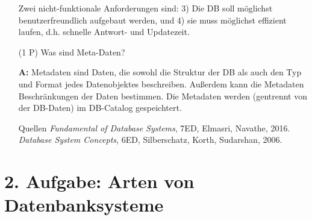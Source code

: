 \documentclass[12pt]{report}
\newcommand{\answer}{\textbf{A:}}
\begin{document}
\begin{enumerate}
  Zwei nicht-funktionale Anforderungen sind: 3) Die DB soll möglichst benutzerfreundlich aufgebaut werden, und 4) sie muss möglichst effizient laufen, d.h. schnelle Antwort- und Updatezeit.


\item[(1 P)] Was sind Meta-Daten?
\item[\answer]
  Metadaten sind Daten, die sowohl die Struktur der DB als auch den Typ und Format jedes Datenobjektes beschreiben. Außerdem kann die Metadaten Beschränkungen der Daten bestimmen. Die Metadaten werden (gentrennt von der DB-Daten) im DB-Catalog gespeichtert.


\item[Quellen]
\textit{Fundamental of Database Systems}, 7ED, Elmasri, Navathe, 2016.\\
\textit{Database System Concepts}, 6ED, Silberschatz, Korth, Sudarshan, 2006.
\end{enumerate}


\section*{2. Aufgabe: Arten von Datenbanksysteme}
\end{document}
